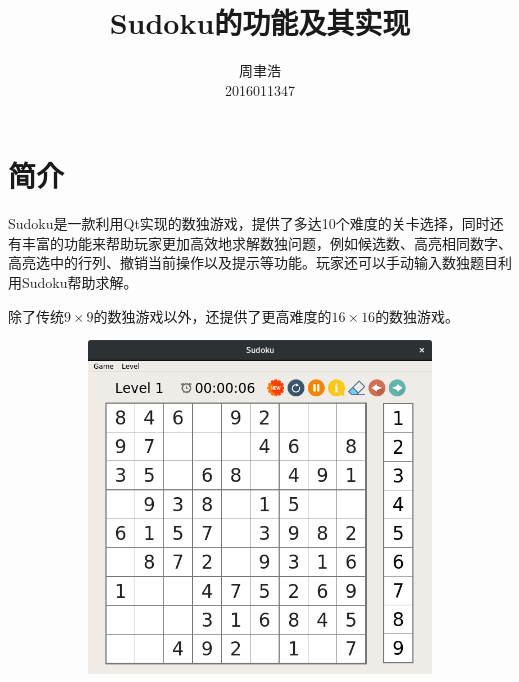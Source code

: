 \documentclass[11pt,a4paper]{article}
\title{Sudoku的功能及其实现}
\author{周聿浩\\ \small{2016011347}}
\begin{document}
\maketitle
\section{简介}
Sudoku是一款利用Qt实现的数独游戏，提供了多达10个难度的关卡选择，同时还有丰富的功能来帮助玩家更加高效地求解数独问题，例如候选数、高亮相同数字、高亮选中的行列、撤销当前操作以及提示等功能。玩家还可以手动输入数独题目利用Sudoku帮助求解。

除了传统$9 \times 9$的数独游戏以外，还提供了更高难度的$16 \times 16$的数独游戏。

\begin{figure}[H]
	\centering
	\begin{subfigure}{.45\textwidth}
		\centering
		\includegraphics[width=\linewidth]{sudoku-3a.png}
	\end{subfigure}
	\hfill
	\begin{subfigure}{.45\textwidth}
		\centering

\end{subfigure}
\end{figure}
\end{document}
